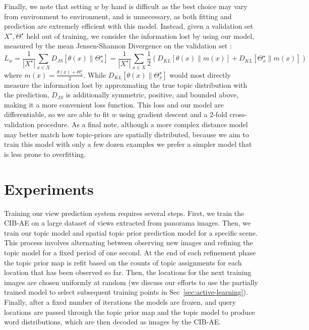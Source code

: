 Finally, we note that setting $w$ by hand is difficult as the best choice may vary from environment to environment, and is unnecessary, as both fitting and prediction are extremely efficient with this model. Instead, given a validation set $X^\star, \Theta^\star$ held out of training, we consider the information lost by using our model, measured by the mean Jensen-Shannon Divergence on the validation set \citep{lin1991divergence}:
\begin{equation}
L_w = \frac{1}{|X^\star|} \sum_{x \in X} D_{JS}\left[\theta(x) \| \Theta^\star_x \right]
 =  \frac{1}{|X^\star|} \sum_{x \in X} \frac{1}{2} \left(D_{KL}\left[\theta(x) \| m(x) \right] + D_{KL}\left[\Theta^\star_x \| m(x) \right]\right)
\end{equation}
where $m(x) = \frac{\theta(x)+\Theta^\star_x}{2}$. While $D_{KL}\left[\theta(x) \| \Theta^\star_x \right]$ would most directly measure the information lost by approxmating the true topic distribution with the prediction, $D_{JS}$ is additionally symmetric, positive, and bounded above, making it a more convenient loss function. This loss and our model are differentiable, so we are able to fit $w$ using gradient descent and a 2-fold cross-validation procedure. As a final note, although a more complex distance model may better match how topic-priors are spatially distributed, because we aim to train this model with only a few dozen examples we prefer a simpler model that is less prone to overfitting.

\section{Experiments}
Training our view prediction system requires several steps. First, we train the CIB-AE on a large dataset of views extracted from panorama images. Then, we train our topic model and spatial topic prior prediction model for a specific scene. This process involves alternating between observing new images and refining the topic model for a fixed period of one second. At the end of each refinement phase the topic prior map is refit based on the counts of topic assignments for each location that has been observed so far. Then, the locations for the next training images are chosen uniformly at random (we discuss our efforts to use the partially trained model to select subsequent training points in Sec~\ref{sec:active-learning}). Finally, after a fixed number of iterations the models are frozen, and query locations are passed through the topic prior map and the topic model to produce word distributions, which are then decoded as images by the CIB-AE.

